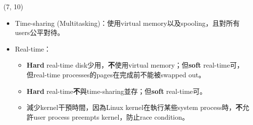 \begin{theorem}{(7, 10)} \quad\quad \begin{itemize}
        \item Time-sharing (Multitasking)：使用virtual memory以及spooling，且對所有users公平對待。
        \item Real-time：\begin{itemize}
            \item \textbf{Hard} real-time disk少用，\textbf{不}使用virtual memory；但\textbf{soft} real-time可，但real-time processes的pages在完成前不能被swapped out。
            \item \textbf{Hard} real-time\textbf{不}與time-sharing並存；但\textbf{soft} real-time可。
            \item 減少kernel干預時間，因為Linux kernel在執行某些system process時，\textbf{不}允許user process preempts kernel，防止race condition。
        \end{itemize}
    \end{itemize}
\end{theorem}
